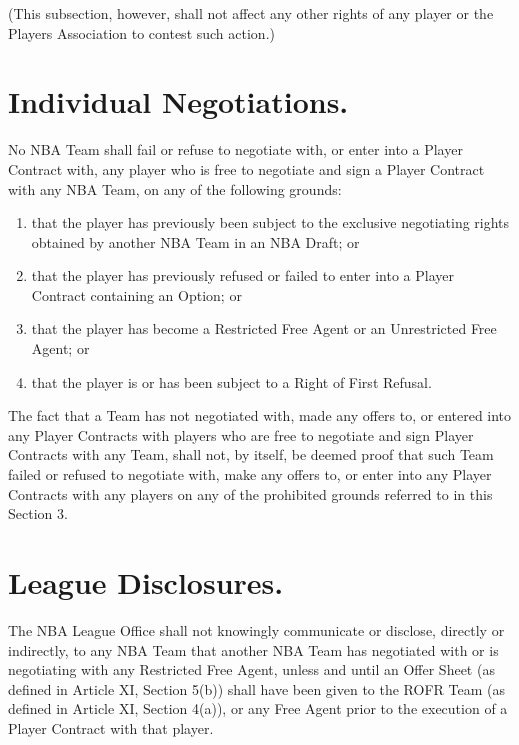 \documentclass[
]{book}
\providecommand{\tightlist}{%
  \setlength{\itemsep}{0pt}\setlength{\parskip}{0pt}}
\begin{document}
(This subsection, however, shall not affect any other rights of any player or the Players Association to contest such action.)

\hypertarget{individual-negotiations.}{%
\section{Individual Negotiations.}\label{individual-negotiations.}}

No NBA Team shall fail or refuse to negotiate with, or enter into a Player Contract with, any player who is free to negotiate and sign a Player Contract with any NBA Team, on any of the following grounds:

\begin{enumerate}
\def\labelenumi{(\alph{enumi})}
\tightlist
\item
  that the player has previously been subject to the exclusive negotiating rights obtained by another NBA Team in an NBA Draft; or
\item
  that the player has previously refused or failed to enter into a Player Contract containing an Option; or
\item
  that the player has become a Restricted Free Agent or an Unrestricted Free Agent; or
\item
  that the player is or has been subject to a Right of First Refusal.
\end{enumerate}

The fact that a Team has not negotiated with, made any offers to, or entered into any Player Contracts with players who are free to negotiate and sign Player Contracts with any Team, shall not, by itself, be deemed proof that such Team failed or refused to negotiate with, make any offers to, or enter into any Player Contracts with any players on any of the prohibited grounds referred to in this Section 3.

\hypertarget{league-disclosures.}{%
\section{League Disclosures.}\label{league-disclosures.}}

The NBA League Office shall not knowingly communicate or disclose, directly or indirectly, to any NBA Team that another NBA Team has negotiated with or is negotiating with any Restricted Free Agent, unless and until an Offer Sheet (as defined in Article XI, Section 5(b)) shall have been given to the ROFR Team (as defined in Article XI, Section 4(a)), or any Free Agent prior to the execution of a Player Contract with that player.
\end{document}
